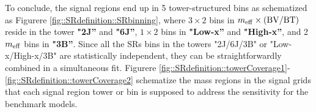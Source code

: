 To conclude, the signal regions end up in 5 tower-structured bins as schematized as Figurere \ref{fig::SRdefinition::SRbinning}, where $3 \times 2$ bins in $m_{\mathrm{eff}} \times \mathrm{(BV/BT)}$ reside in the tower \textbf{"2J''} and \textbf{"6J''}, $1 \times 2$ bins in \textbf{"Low-x''} and \textbf{"High-x''}, and 2 $m_{\mathrm{eff}}$ bins in \textbf{"3B''}. Since all the SRs bins in the towers "2J/6J/3B" or "Low-x/High-x/3B" are statistically independent, they can be straightforwardly combined in a simultaneous fit. 
%
Figurere \ref{fig::SRdefinition::towerCoverage1}-\ref{fig::SRdefinition::towerCoverage2} schematize the mass regions in the signal grids that each signal region tower or bin is supposed to address the sensitivity for the benchmark models.


